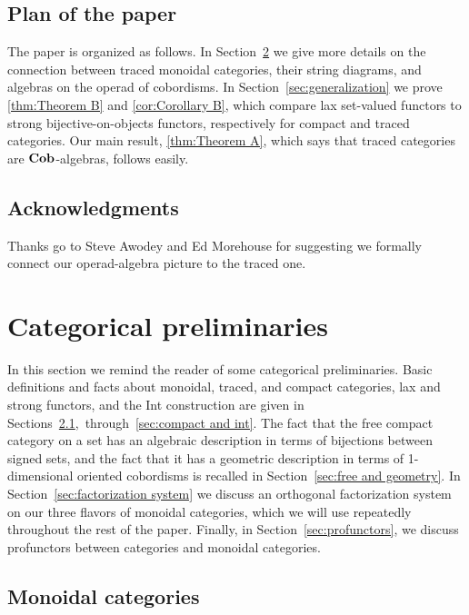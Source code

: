 \documentclass[12pt,oneside,article,draft]{memoir}
\begin{document}
\section{Plan of the paper}

The paper is organized as follows. In Section~\ref{sec:traced categories} we give more details on the connection between traced monoidal categories, their string diagrams, and algebras on the operad of cobordisms. In Section~\ref{sec:generalization} we prove \ref{thm:Theorem B} and \ref{cor:Corollary B}, which compare lax set-valued functors to strong bijective-on-objects functors, respectively for compact and traced categories. Our main result, \ref{thm:Theorem A}, which says that traced categories are $\mathbf{Cob}$-algebras, follows easily.

\section*{Acknowledgments}

Thanks go to Steve Awodey and Ed Morehouse for suggesting we formally connect our operad-algebra picture to the traced one. 

\chapter{Categorical preliminaries}\label{sec:traced categories}

In this section we remind the reader of some categorical preliminaries. Basic definitions and facts about monoidal, traced, and compact categories, lax and strong functors, and the Int construction are given in Sections~\ref{sec:prelim monoidal},~through~\ref{sec:compact and int}. The fact that the free compact category on a set has an algebraic description in terms of bijections between signed sets, and the fact that it has a geometric description in terms of 1-dimensional oriented cobordisms is recalled in Section~\ref{sec:free and geometry}. In Section~\ref{sec:factorization system} we discuss an orthogonal factorization system on our three flavors of monoidal categories, which we will use repeatedly throughout the rest of the paper. Finally, in Section~\ref{sec:profunctors}, we discuss profunctors between categories and monoidal categories.

\section{Monoidal categories}\label{sec:prelim monoidal}
\end{document}
